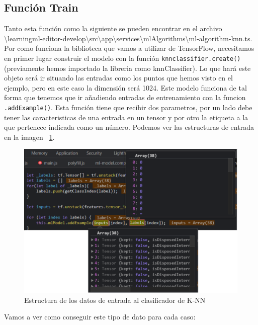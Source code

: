\documentclass[a4paper, 12pt]{book}
\begin{document}
\subsection{Función Train} 
\label{sec:funciontrainknn}

Tanto esta función como la siguiente se pueden encontrar en el archivo \textbackslash learningml-editor-develop\textbackslash src\textbackslash app\textbackslash services\textbackslash mlAlgorithms\textbackslash ml-algorithm-knn.ts.\\
Por como funciona la biblioteca que vamos a utilizar de TensorFlow, necesitamos en primer lugar construir el modelo con la función  \texttt{knnclassifier.create()} (previamente hemos importado la libreria como knnClassifier). Lo que hará este objeto será ir situando las entradas como los puntos que hemos visto en el ejemplo, pero en este caso la dimensión será 1024. Este modelo funciona de tal forma que tenemos que ir añadiendo entradas de entrenamiento con la funcion \texttt{.addExample()}. Esta función tiene que recibir dos parametros, por un lado debe tener las caracteristicas de una entrada en un tensor y por otro la etiqueta a la que pertenece indicada como un número. Podemos ver las estructuras de entrada en la imagen ~\ref{fig:entradasclasificadorknn}.

\begin{figure}
	\centering
	\includegraphics[width=12cm, keepaspectratio]{img/entradasclasificadorknn}
	\caption{Estructura de los datos de entrada al clasificador de K-NN}				
	\label{fig:entradasclasificadorknn}
\end{figure}

Vamos a ver como conseguir este tipo de dato para cada caso:
\end{document}
